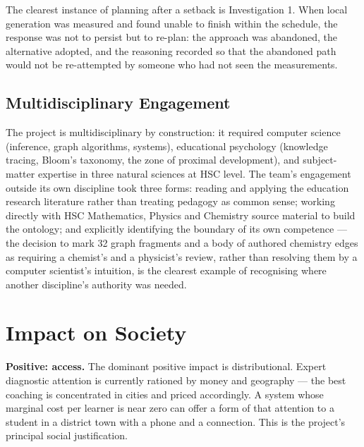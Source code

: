 The clearest instance of planning after a setback is Investigation 1. When local
generation was measured and found unable to finish within the schedule, the
response was not to persist but to re-plan: the approach was abandoned, the
alternative adopted, and the reasoning recorded so that the abandoned path would
not be re-attempted by someone who had not seen the measurements.


\subsection{Multidisciplinary Engagement}
\label{sec:multidisciplinary}

The project is multidisciplinary by construction: it required computer science
(inference, graph algorithms, systems), educational psychology (knowledge
tracing, Bloom's taxonomy, the zone of proximal development), and subject-matter
expertise in three natural sciences at HSC level. The team's engagement outside
its own discipline took three forms: reading and applying the education research
literature rather than treating pedagogy as common sense; working directly with
HSC Mathematics, Physics and Chemistry source material to build the ontology;
and explicitly identifying the boundary of its own competence --- the decision to
mark 32 graph fragments and a body of authored chemistry edges as requiring a
chemist's and a physicist's review, rather than resolving them by a
computer scientist's intuition, is the clearest example of recognising where
another discipline's authority was needed.


\section{Impact on Society}
\label{sec:society}

\textbf{Positive: access.} The dominant positive impact is distributional. Expert
diagnostic attention is currently rationed by money and geography --- the best
coaching is concentrated in cities and priced accordingly. A system whose
marginal cost per learner is near zero can offer a form of that attention to a
student in a district town with a phone and a connection. This is the project's
principal social justification.

